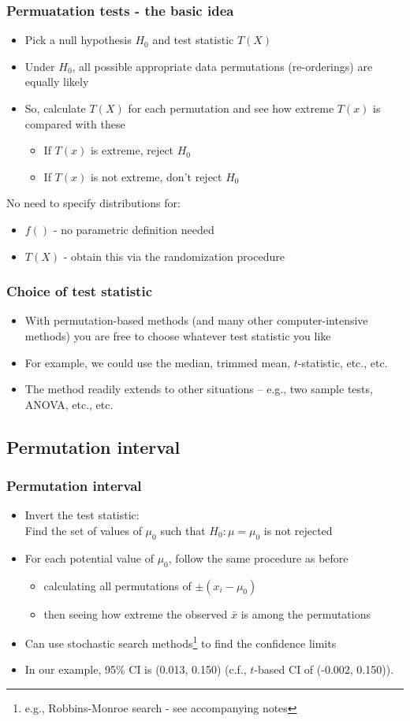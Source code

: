 \documentclass[ignorenonframetext]{beamer} %
\newcommand{\bi}{\begin{itemize}}
\newcommand{\ei}{\end{itemize}}
\begin{document}
\begin{frame}
	\frametitle{Permuatation tests - the basic idea}
	\bi
		\item Pick a null hypothesis $H_0$ and test statistic $T(X)$
		\item Under $H_0$, all possible appropriate data permutations (re-orderings) are equally likely
		\item So, calculate $T(X)$ for each permutation and see how extreme $T(x)$ is compared with these
			\bi
		  \item If $T(x)$ is extreme, reject $H_0$
		  \item If $T(x)$ is not extreme, don't reject $H_0$
		  \ei
  \ei
 No need to specify distributions for:
  \bi
		\item $f()$ - no parametric definition needed
		\item $T(X)$ - obtain this via the randomization procedure
	\ei
\end{frame}

\begin{frame}
	\frametitle{Choice of test statistic}
	\bi
		\item With permutation-based methods (and many other computer-intensive methods) you are free to choose whatever test statistic you like
		\item For example, we could use the median, trimmed mean, $t$-statistic, etc., etc.
		\item The method readily extends to other situations -- e.g., two sample tests, ANOVA, etc., etc.
	\ei
\end{frame}

\subsection{Permutation interval}

\begin{frame}
	\frametitle{Permutation interval}
	\bi
		\item Invert the test statistic: \\
		      Find the set of values of $\mu_0$ such that $H_0: \mu=\mu_0$ is not rejected
		\item For each potential value of $\mu_0$, follow the same procedure as before 
		\bi
		  \item calculating all permutations of $\pm (x_i - \mu_0)$
		  \item then seeing how extreme the observed $\bar{x}$ is among the permutations
		\ei
		\item Can use stochastic search methods\footnote{e.g., Robbins-Monroe search - see accompanying notes} to find the confidence limits
		\item In our example, 95\% CI is (0.013, 0.150) (c.f., $t$-based CI of (-0.002, 0.150)).
	\ei
\end{frame}
\end{document}
